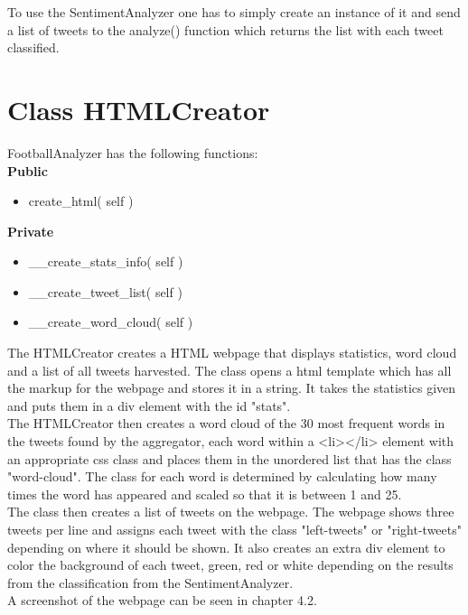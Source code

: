 To use the SentimentAnalyzer one has to simply create an instance of it and send a list of tweets to the analyze() function which returns the list with each tweet classified.

\clearpage

\section{Class HTMLCreator} \label{sec:HTMLCreatorImplementation}
FootballAnalyzer has the following functions:\\

{\bf Public}
\begin{itemize}
\item create\_html( self )
\end{itemize}

{\bf Private}
\begin{itemize}
\item \_\_create\_stats\_info( self )
\item \_\_create\_tweet\_list( self )
\item \_\_create\_word\_cloud( self )
\end{itemize}

The HTMLCreator creates a HTML webpage that displays statistics, word cloud and a list of all tweets harvested. The class opens a html template which has all the markup for the webpage and stores it in a string. It takes the statistics given and puts them in a div element with the id "stats".\\

The HTMLCreator then creates a word cloud of the 30 most frequent words in the tweets found by the aggregator, each word within a <li></li> element with an appropriate css class and places them in the unordered list that has the class "word-cloud". The class for each word is determined by calculating how many times the word has appeared and scaled so that it is between 1 and 25.\\

The class then creates a list of tweets on the webpage. The webpage shows three tweets per line and assigns each tweet with the class "left-tweets" or "right-tweets" depending on where it should be shown. It also creates an extra div element to color the background of each tweet, green, red or white depending on the results from the classification from the SentimentAnalyzer. \\

A screenshot of the webpage can be seen in chapter 4.2.